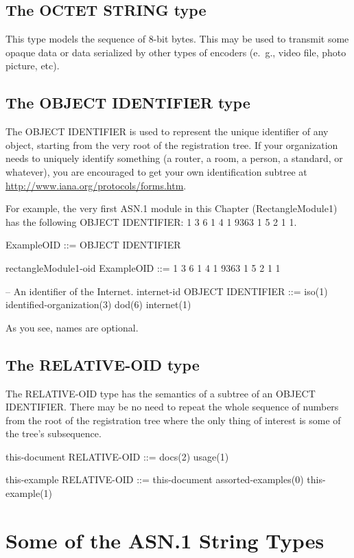 \documentclass[english,oneside,12pt]{book}
\begin{document}
\subsection{The OCTET STRING type}

This type models the sequence of 8-bit bytes. This may be used to
transmit some opaque data or data serialized by other types of encoders
(e.~g., video file, photo picture, etc).

\subsection{The OBJECT IDENTIFIER type}

The OBJECT IDENTIFIER is used to represent the unique identifier of
any object, starting from the very root of the registration tree.
If your organization needs to uniquely identify something (a router,
a room, a person, a standard, or whatever), you are encouraged to
get your own identification subtree at \url{http://www.iana.org/protocols/forms.htm}.

For example, the very first ASN.1 module in this Chapter (RectangleModule1)
has the following OBJECT IDENTIFIER: 1 3 6 1 4 1 9363 1 5 2 1 1.
\begin{asn}
ExampleOID ::= OBJECT IDENTIFIER

rectangleModule1-oid ExampleOID
  ::= { 1 3 6 1 4 1 9363 1 5 2 1 1 }

-- An identifier of the Internet.
internet-id OBJECT IDENTIFIER
  ::= { iso(1) identified-organization(3)
        dod(6) internet(1) }
\end{asn}
As you see, names are optional.


\subsection{The RELATIVE-OID type}

The RELATIVE-OID type has the semantics of a subtree of an OBJECT
IDENTIFIER. There may be no need to repeat the whole sequence of numbers
from the root of the registration tree where the only thing of interest
is some of the tree's subsequence.
\begin{asn}
this-document RELATIVE-OID ::= { docs(2) usage(1) }

this-example RELATIVE-OID ::= {
    this-document assorted-examples(0) this-example(1) }
\end{asn}

\section{Some of the ASN.1 String Types}
\end{document}
